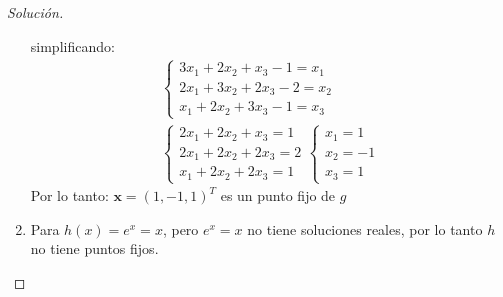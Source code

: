 \documentclass[12pt]{book}
\newenvironment{solucion}
  {\renewcommand\qedsymbol{$\square$}\begin{proof}[Solución]}
  {\end{proof}}
\begin{document}
\begin{solucion}
\begin{enumerate}
        simplificando:
        \begin{align*}
            \begin{cases}
                3x_1+2x_2+x_3-1=x_1\\
                2x_1+3x_2+2x_3-2=x_2\\
                x_1+2x_2+3x_3-1=x_3
            \end{cases}\\
            \begin{cases}
                2x_1+2x_2+x_3=1\\
                2x_1+2x_2+2x_3=2\\
                x_1+2x_2+2x_3=1
            \end{cases}
            \begin{cases}
                x_1=1\\
                x_2=-1\\
                x_3=1
            \end{cases}
        \end{align*}
        Por lo tanto: $\bm{x}=(1,-1,1)^T$ es un punto fijo de $g$
        \item Para $h(x)=e^x = x$, pero $e^x = x$ no tiene soluciones reales, por lo tanto $h$ no tiene puntos fijos.\\
\end{enumerate}
\end{solucion}
\end{document}
